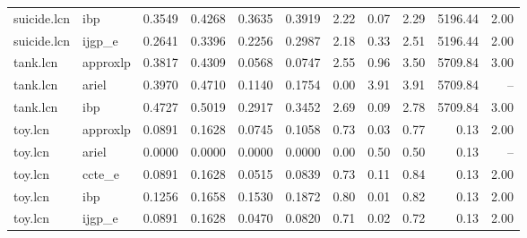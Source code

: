 \begin{table}[ht]
\begin{tabular}{llrrrrrrrrr}
suicide.lcn & ibp & 0.3549 & 0.4268 & 0.3635 & 0.3919 & 2.22 & 0.07 & 2.29 & 5196.44 & 2.00 \\
suicide.lcn & ijgp_e & 0.2641 & 0.3396 & 0.2256 & 0.2987 & 2.18 & 0.33 & 2.51 & 5196.44 & 2.00 \\
tank.lcn & approxlp & 0.3817 & 0.4309 & 0.0568 & 0.0747 & 2.55 & 0.96 & 3.50 & 5709.84 & 3.00 \\
tank.lcn & ariel & 0.3970 & 0.4710 & 0.1140 & 0.1754 & 0.00 & 3.91 & 3.91 & 5709.84 & -- \\
tank.lcn & ibp & 0.4727 & 0.5019 & 0.2917 & 0.3452 & 2.69 & 0.09 & 2.78 & 5709.84 & 3.00 \\
toy.lcn & approxlp & 0.0891 & 0.1628 & 0.0745 & 0.1058 & 0.73 & 0.03 & 0.77 & 0.13 & 2.00 \\
toy.lcn & ariel & 0.0000 & 0.0000 & 0.0000 & 0.0000 & 0.00 & 0.50 & 0.50 & 0.13 & -- \\
toy.lcn & ccte_e & 0.0891 & 0.1628 & 0.0515 & 0.0839 & 0.73 & 0.11 & 0.84 & 0.13 & 2.00 \\
toy.lcn & ibp & 0.1256 & 0.1658 & 0.1530 & 0.1872 & 0.80 & 0.01 & 0.82 & 0.13 & 2.00 \\
toy.lcn & ijgp_e & 0.0891 & 0.1628 & 0.0470 & 0.0820 & 0.71 & 0.02 & 0.72 & 0.13 & 2.00 \\
\bottomrule
\end{tabular}
\end{table}
